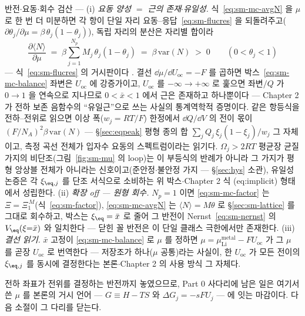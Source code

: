 \begin{verifybox}
반전$\cdot$요동$\cdot$회수 검산 --- (i) \emph{요동 양성 $=$ 근의 존재$\cdot$유일성.}
식~\eqref{eq:sm-mc-avgN} 을 $\mu$ 로 한 번 더 미분하면 각 항이 단일 자리
요동--응답~\eqref{eq:sm-flucres} 을 되돌려주고($\partial\theta_j/\partial\mu
=\beta\,\theta_j(1-\theta_j)$), 독립 자리의 분산은 자리별 합이라
\begin{equation}
\frac{\partial\langle N\rangle}{\partial\mu}
\;=\;\beta\sum_{j=1}^{N_p}M_j\,\theta_j(1-\theta_j)
\;=\;\beta\,\mathrm{var}(N)\;>\;0\qquad(0<\theta_j<1)
\label{eq:sm-mc-mono}
\end{equation}
--- 식~\eqref{eq:sm-flucres} 의 거시판이다 \cite{mcquarrie1976}. 결선
$\dd\mu/\dd U_{\mathrm{oc}}=-F$ 를 곱하면 박스~\eqref{eq:sm-mc-balance} 좌변은 $U_{\mathrm{oc}}$ 에
강증가이고, $U_{\mathrm{oc}}$ 를 $-\infty\to+\infty$ 로 훑으면 좌변$/Q$ 가 $0\to1$ 을 연속으로
지나므로 $0<\bar x<1$ 에서 근은 존재하고 하나뿐이다 --- Chapter 2 가 전하 보존 음함수의
``유일근''으로 쓰는 사실의 통계역학적 증명이다. 같은 항등식을 전하--전위로 읽으면 이상
폭($w_j=RT/F$) 한정에서 $\dd Q/\dd V$ 의 전이 몫이 $(F/N_A)^2\beta\,\mathrm{var}(N)$ ---
\S\ref{sec:eqpeak} 평형 종의 합 $\sum_jQ_j\,\xi_j(1-\xi_j)/w_j$ 그 자체이고, 측정 곡선 전체가 입자수
요동의 스펙트럼이라는 읽기다. $\Omega_j>2RT$ 평균장 균질 가지의 비단조(그림~\ref{fig:sm-mu} 의
loop)는 이 부등식의 반례가 아니라 그 가지가 평형 앙상블 전체가 아니라는 신호이고(준안정$\cdot$불안정
가지 --- \S\ref{sec:hys} 소관), 유일성 논증은 각 $\xi_{\eq,j}$ 를 단조 서식으로 소비하는 위
박스$\cdot$Chapter 2 식 (eq:implicit) 형태에서 성립한다. (ii) \emph{확장 off --- 원형 회수.}
$N_p=1$ 이면 \eqref{eq:sm-mc-factor} 는 $\Xi=\Xi_1^{\,M}$(식~\eqref{eq:sm-factor}),
\eqref{eq:sm-mc-avgN} 는 $\langle N\rangle=M\theta$ 로 \S\ref{sec:sm-lattice} 를 그대로 회수하고,
박스는 $\xi_\eq=\bar x$ 로 줄어 그 반전이 Nernst~\eqref{eq:sm-nernst} 의 $V_\eq(\xi{=}\bar x)$ 와
일치한다 --- 닫힌 꼴 반전은 이 단일 클래스 극한에서만 존재한다. (iii) \emph{결선 읽기.} $\bar x$
고정이 \eqref{eq:sm-mc-balance} 로 $\mu$ 를 정하면 $\mu=\mu_\mathrm{Li}^\mathrm{metal}
-FU_{\mathrm{oc}}$ 가 그 $\mu$ 를 곧장 $U_{\mathrm{oc}}$ 로 번역한다 --- 저장조가 하나($\mu$
공통)라는 사실이, 한 $U_{\mathrm{oc}}$ 가 모든 전이의 $\xi_{\eq,j}$ 를 동시에 결정한다는
본론$\cdot$Chapter 2 의 사용 방식 그 자체다.
\end{verifybox}

전하 좌표가 전위를 결정하는 반전까지 놓였으므로, Part 0 사다리에 남은 일은 여기서 쓴 $\mu$ 를 본론의
거시 언어 --- $G\equiv H-TS$ 와 $\Delta G_j=-sFU_j$ --- 에 잇는 마감이다. 다음 소절이 그 다리를
닫는다.

